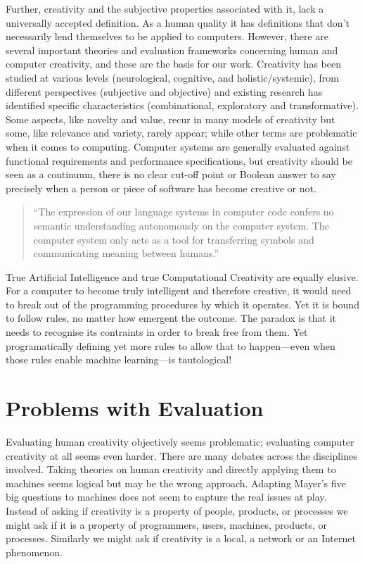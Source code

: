 \begin{leftbar}
Further, creativity and the subjective properties associated with it, lack a universally accepted definition. As a human quality it has definitions that don’t necessarily lend themselves to be applied to computers. However, there are several important theories and evaluation frameworks concerning human and computer creativity, and these are the basis for our work. Creativity has been studied at various levels (neurological, cognitive, and holistic/systemic), from different perspectives (subjective and objective) and existing research has identified specific characteristics (combinational, exploratory and transformative). Some aspects, like novelty and value, recur in many models of creativity but some, like relevance and variety, rarely appear; while other terms are problematic when it comes to computing. Computer systems are generally evaluated against functional requirements and performance specifications, but creativity should be seen as a continuum, there is no clear cut-off point or Boolean answer to say precisely when a person or piece of software has become creative or not.

\begin{quotation}
  ``The expression of our language systems in computer code confers no semantic understanding autonomously on the computer system. The computer system only acts as a tool for transferring symbols and communicating meaning between humans.'' 
\end{quotation}

True Artificial Intelligence and true Computational Creativity are equally elusive. For a computer to become truly intelligent and therefore creative, it would need to break out of the programming procedures by which it operates. Yet it is bound to follow rules, no matter how emergent the outcome. The paradox is that it needs to recognise its contraints in order to break free from them. Yet programatically defining yet more rules to allow that to happen---even when those rules enable machine learning---is tautological!
\end{leftbar}


\section{Problems with Evaluation}

Evaluating human creativity objectively seems problematic; evaluating computer creativity at all seems even harder. There are many debates across the disciplines involved. Taking theories on human creativity and directly applying them to machines seems logical but may be the wrong approach. Adapting Mayer's five big questions to machines does not seem to capture the real issues at play. Instead of asking if creativity is a property of people, products, or processes we might ask if it is a property of programmers, users, machines, products, or processes. Similarly we might ask if creativity is a local, a network or an Internet phenomenon.

